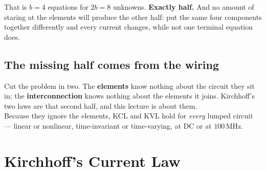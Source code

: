 \documentclass[11pt,a4paper]{article}
\newcommand{\uni}[1]{\,\mathrm{#1}}
\begin{document}
That is $b = 4$ equations for $2b = 8$ unknowns. \textbf{Exactly half.} And no amount of
staring at the elements will produce the other half: put the same four components together
differently and every current changes, while not one terminal equation does.

\subsection{The missing half comes from the wiring}

\begin{center}
\end{center}

\begin{ideabox}
Cut the problem in two. The \textbf{elements} know nothing about the circuit they sit in;
the \textbf{interconnection} knows nothing about the elements it joins. Kirchhoff's two
laws are that second half, and this lecture is about them.\\[3pt]
Because they ignore the elements, KCL and KVL hold for \emph{every} lumped circuit ---
linear or nonlinear, time-invariant or time-varying, at DC or at $100\uni{MHz}$.
\end{ideabox}


\section{Kirchhoff's Current Law}
\end{document}
